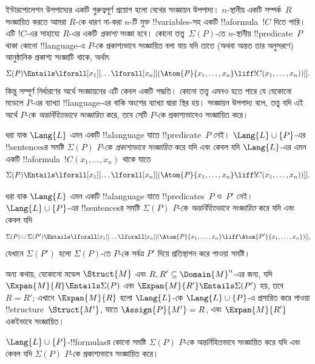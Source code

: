 \documentclass[../../../include/open-logic-section]{subfiles}
\begin{document}


ইন্টারপোলেশন উপপাদ্যের একটি গুরুত্বপূর্ণ প্রয়োগ হলো বেথের সংজ্ঞায়ন
উপপাদ্য। $n$-স্থানীয় একটি সম্পর্ক~$R$ সংজ্ঞায়িত করতে আমরা $R$-কে
ধারণ না-করা $n$-টি মুক্ত !!{variable}s-সহ একটি !!a{formula}~$!C$
দিতে পারি। এটি $!C$-এর সাহায্যে $R$-এর একটি \emph{প্রকাশ্য}
সংজ্ঞা হবে। কোনো তত্ত্ব~$\Sigma(P)$-তে $n$-স্থানীয় !!{predicate}~$P$
থাকা কোনো !!{language}-এ $P$-কে প্রকাশ্যভাবে সংজ্ঞায়িত বলা যায় যদি
তাতে (অথবা অন্তত তার অনুসরণে) আনুষ্ঠানিক প্রকাশ্য সংজ্ঞাটি থাকে, অর্থাৎ
\[
\Sigma(P) \Entails \lforall[x_1][\dots
  \lforall[x_n][(\Atom{P}{x_1,\dots, x_n} \liff !C(x_1, \dots,
    x_n))]].
\]
কিন্তু সম্পূর্ণ নির্ধারণের অর্থে সংজ্ঞায়নের এটি কেবল একটি পদ্ধতি।
কোনো তত্ত্ব এমনও হতে পারে যে যেকোনো মডেলে $P$-এর ব্যাখ্যা
!!{language}-এর বাকি অংশের ব্যাখ্যা দ্বারা স্থির হয়। সংজ্ঞায়ন উপপাদ্য
বলে, তত্ত্ব যদি এই অর্থে $P$-কে \emph{অন্তর্নিহিতভাবে সংজ্ঞায়িত}
করে, তবে সেটি $P$-কে প্রকাশ্যভাবেও সংজ্ঞায়িত করে।

\begin{defn}
ধরা যাক $\Lang{L}$ এমন একটি !!a{language} যাতে !!{predicate}~$P$
নেই। $\Lang{L} \cup \{P\}$-এর !!{sentence}sর সমষ্টি
$\Sigma(P)$ $P$-কে \emph{প্রকাশ্যভাবে সংজ্ঞায়িত} করে যদি এবং কেবল
যদি $\Lang{L}$-এর এমন একটি !!a{formula}~$!C(x_1, \dots, x_n)$ থাকে
যাতে
\[
\Sigma(P) \Entails \lforall[x_1][\dots
  \lforall[x_n][(\Atom{P}{x_1,\dots, x_n} \liff !C(x_1, \dots,
    x_n))]].
\]
\end{defn}

\begin{defn}
ধরা যাক $\Lang{L}$ এমন একটি !!a{language} যাতে !!{predicate}s~$P$
ও~$P'$ নেই। $\Lang{L} \cup \{P\}$-এর !!{sentence}sর সমষ্টি
$\Sigma(P)$ $P$-কে \emph{অন্তর্নিহিতভাবে সংজ্ঞায়িত} করে যদি এবং
কেবল যদি
\[
\Sigma(P) \cup \Sigma(P') \Entails \lforall[x_1][\dots
  \lforall[x_n][(\Atom{P}{x_1,\dots, x_n} \liff \Atom{P'}{x_1,\dots,
      x_n})]],
\]
যেখানে $\Sigma(P')$ হলো $\Sigma(P)$-তে $P$-কে সর্বত্র $P'$ দিয়ে
প্রতিস্থাপন করে পাওয়া সমষ্টি।
\end{defn}

অন্য কথায়, যেকোনো মডেল $\Struct{M}$ এবং
$R, R' \subseteq \Domain{M}^n$-এর জন্য, যদি
$\Expan{M}{R} \Entails \Sigma(P)$ এবং
$\Expan{M}{R'} \Entails \Sigma(P')$ হয়, তবে $R=R'$; এখানে
$\Expan{M}{R}$ হলো $\Lang{L}$-কে $\Lang{L} \cup \{P\}$-এ
প্রসারিত করে পাওয়া !!{structure}~$\Struct{M'}$, যাতে
$\Assign{P}{M'} = R$, এবং $\Expan{M}{R'}$ একইভাবে সংজ্ঞায়িত।

\begin{thm}[বেথের সংজ্ঞায়ন উপপাদ্য] $\Lang{L}
  \cup\{P\}$-!!{formula}sর কোনো সমষ্টি $\Sigma(P)$ $P$-কে
  অন্তর্নিহিতভাবে সংজ্ঞায়িত করে যদি এবং কেবল যদি $\Sigma(P)$
  $P$-কে প্রকাশ্যভাবে সংজ্ঞায়িত করে।
\end{thm}
\end{document}
